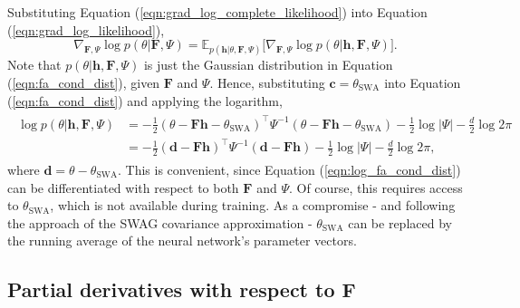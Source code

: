 \documentclass[msc,deptreport.inf]{infthesis} %
\newcommand{\matr}[1]{\mathbf{#1}}
\newcommand{\E}{\mathbb E}
\begin{document}
Substituting Equation (\ref{eqn:grad_log_complete_likelihood}) into Equation (\ref{eqn:grad_log_likelihood}),
\begin{equation}\label{eqn:simplified_grad_log_likelihood}
	\nabla_{\matr{F}, \Psi} \log p(\theta | \matr{F}, \Psi)
	= \E_{p(\matr{h} | \theta, \matr{F}, \Psi)} \big[ \nabla_{\matr{F}, \Psi} \log p(\theta | \matr{h}, \matr{F}, \Psi) \big].
\end{equation}
Note that $p(\theta | \matr{h}, \matr{F}, \Psi)$ is just the Gaussian distribution in Equation (\ref{eqn:fa_cond_dist}), given $\matr{F}$ and $\Psi$. Hence, substituting $\matr{c} = \theta_{\text{SWA}}$ into Equation (\ref{eqn:fa_cond_dist}) and applying the logarithm,
\begin{align}\label{eqn:log_fa_cond_dist}
\begin{split}
	\log p(\theta | \matr{h}, \matr{F}, \Psi)
	& = -\frac{1}{2} (\theta - \matr{Fh} - \theta_{\text{SWA}})^\intercal \Psi^{-1} (\theta - \matr{Fh} - \theta_{\text{SWA}}) - \frac{1}{2} \log |\Psi| - \frac{d}{2} \log 2\pi \\
	& = -\frac{1}{2} (\matr{d} - \matr{Fh})^\intercal \Psi^{-1} (\matr{d}- \matr{Fh}) - \frac{1}{2} \log |\Psi| - \frac{d}{2} \log 2\pi,
\end{split}
\end{align}
where $\matr{d} = \theta - \theta_{\text{SWA}}$. This is convenient, since Equation (\ref{eqn:log_fa_cond_dist}) can be differentiated with respect to both $\matr{F}$ and $\Psi$. Of course, this requires access to $\theta_{\text{SWA}}$, which is not available during training. As a compromise - and following the approach of the SWAG covariance approximation - $\theta_{\text{SWA}}$ can be replaced by the running average of the neural network's parameter vectors.

\subsection{Partial derivatives with respect to $\matr{F}$}
\end{document}
